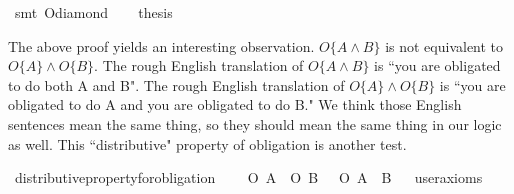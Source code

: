\begin{isabellebody}
\ {\isacharparenleft}smt\ O{\isacharunderscore}diamond{\isacharparenright}\isanewline
%
\isanewline
\ \ \isamarkupfalse%
\ {\isacharquery}thesis\ \isamarkupfalse%
\isanewline
%
\isanewline
%
%
\endisatagproof
{\isafoldproof}%
%
\isadelimproof
%
\endisadelimproof
%
\begin{isamarkuptext}%
The above proof yields an interesting observation.  $O \{ A \wedge B \} $ is not equivalent to 
$O\{A\} \wedge O\{B\}$. The rough English translation of  $O \{ A \wedge B \} $ is ``you are obligated to 
do both A and B". The rough English translation of $O\{A\} \wedge O\{B\}$ is ``you are obligated to do A 
and you are obligated to do B." We think those English sentences mean the same thing, so they should mean 
the same thing in our logic as well. This ``distributive" property of obligation is another test.%
\end{isamarkuptext}\isamarkuptrue%
\isamarkupfalse%
\ distributive{\isacharunderscore}property{\isacharunderscore}for{\isacharunderscore}obligation{\isacharcolon}\isanewline
\ \ \ {\isachardoublequoteopen}{\isasymTurnstile}\ {\isacharparenleft}O\ {\isacharbraceleft}A{\isacharbraceright}\ \isactrlbold {\isasymand}\ O\ {\isacharbraceleft}B{\isacharbraceright}{\isacharparenright}\ {\isasymequiv}\ {\isasymTurnstile}\ O\ {\isacharbraceleft}A\ \isactrlbold {\isasymand}\ B{\isacharbraceright}{\isachardoublequoteclose}\isanewline
\ \ \isamarkupfalse%
{\isacharbrackleft}user{\isacharunderscore}axioms{\isacharbrackright}%
\isadelimproof
\ %
\endisadelimproof
%
\isatagproof
{}\isamarkupfalse%
\isanewline
%
\end{isabellebody}
